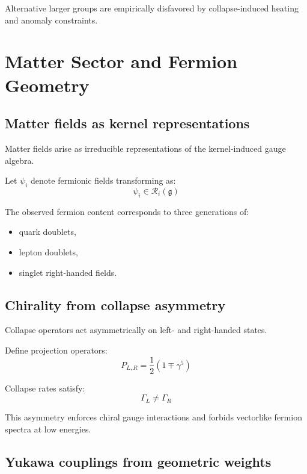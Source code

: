 \documentclass[11pt]{book}
\begin{document}
Alternative larger groups are empirically disfavored by collapse-induced
heating and anomaly constraints.

\chapter{Matter Sector and Fermion Geometry}

\section{Matter fields as kernel representations}

Matter fields arise as irreducible representations of the kernel-induced
gauge algebra.

Let $\psi_i$ denote fermionic fields transforming as:
\begin{equation}
\psi_i \in \mathcal{R}_i(\mathfrak{g})
\end{equation}

The observed fermion content corresponds to three generations of:
\begin{itemize}
\item quark doublets,
\item lepton doublets,
\item singlet right-handed fields.
\end{itemize}

\section{Chirality from collapse asymmetry}

Collapse operators act asymmetrically on left- and right-handed states.

Define projection operators:
\begin{equation}
P_{L,R} = \frac{1}{2}(1 \mp \gamma^5)
\end{equation}

Collapse rates satisfy:
\begin{equation}
\Gamma_L \neq \Gamma_R
\end{equation}

This asymmetry enforces chiral gauge interactions and forbids vectorlike
fermion spectra at low energies.

\section{Yukawa couplings from geometric weights}
\end{document}
